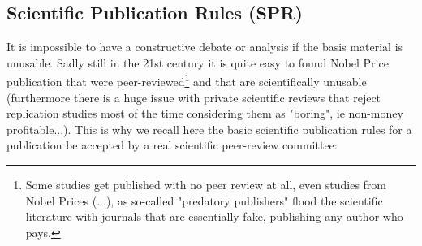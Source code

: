 	\pagebreak
	\subsection{Scientific Publication Rules (SPR)}
	It is impossible to have a constructive debate or analysis if the basis material is unusable. Sadly still in the 21st century it is quite easy to found Nobel Price publication that were peer-reviewed\footnote{Some studies get published with no peer review at all, even studies from Nobel Prices (...), as so-called "predatory publishers" flood the scientific literature with journals that are essentially fake, publishing any author who pays.} and that are scientifically unusable (furthermore there is a huge issue with private scientific reviews that reject replication studies most of the time considering them as "boring", ie non-money profitable...). This is why we recall here the basic scientific publication rules for a publication be accepted by a real scientific peer-review committee:
